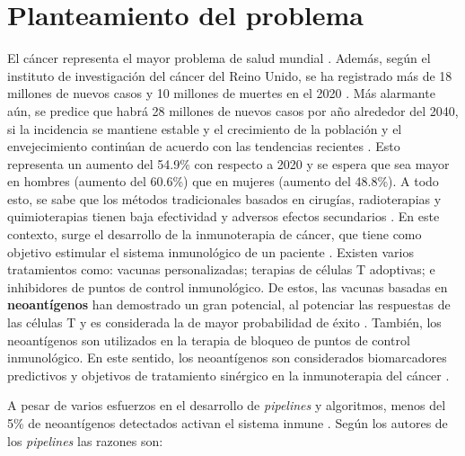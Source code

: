 \documentclass[a4paper,11pt]{article}
\begin{document}
\section{Planteamiento del problema }

El cáncer representa el mayor problema de salud mundial \cite{siegel2023cancer}. Además, según el instituto de investigación del cáncer del Reino Unido, se ha registrado más de 18 millones de nuevos casos y 10 millones de muertes en el 2020 \cite{cancerUK2023}. Más alarmante aún, se predice que habrá 28 millones de nuevos casos por año alrededor del 2040, si la incidencia se mantiene estable y el crecimiento de la población y el envejecimiento continúan de acuerdo con las tendencias recientes \cite{cancerUK2023_2}. Esto representa un aumento del 54.9\% con respecto a 2020 y se espera que sea mayor en hombres (aumento del 60.6\%) que en mujeres (aumento del 48.8\%).	A todo esto, se sabe que los métodos tradicionales basados en cirugías, radioterapias y quimioterapias tienen baja efectividad y adversos efectos secundarios \cite{peng2019neoantigen}. En este contexto, surge el desarrollo de la inmunoterapia de cáncer, que tiene como objetivo estimular el sistema inmunológico de un paciente \cite{borden2022cancer}. Existen varios tratamientos como: vacunas personalizadas; terapias de células T adoptivas; e inhibidores de puntos de control inmunológico. De estos, las vacunas basadas en \textbf{neoantígenos} han demostrado un gran potencial, al potenciar las respuestas de las células T y es considerada la de mayor probabilidad de éxito \cite{borden2022cancer}. También, los neoantígenos son utilizados en la terapia de bloqueo de puntos de control inmunológico. En este sentido, los neoantígenos son considerados biomarcadores predictivos y objetivos de tratamiento sinérgico en la inmunoterapia del cáncer \cite{fang2022neoantigens}.

A pesar de varios esfuerzos en el desarrollo de \textit{pipelines} y algoritmos, menos del 5\% de neoantígenos detectados activan el sistema inmune \cite{de2020neoantigen, mill2022neoms, bulik2019deep, bassani2015mass, yadav2014predicting}. Según los autores de los \textit{pipelines} las razones son: 
\end{document}
